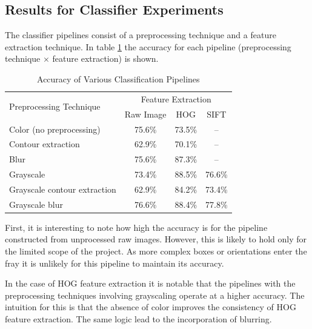 \documentclass[letterpaper, 10 pt, conference]{conf/ieeeconf}  %
\begin{document}
\subsection{Results for Classifier Experiments}
The classifier pipelines consist of a preprocessing technique and a feature
extraction technique. In table \ref{tab:classification} the accuracy for each
pipeline (preprocessing technique $\times$ feature extraction) is shown.
\begin{table}[h]
  \centering
  \begin{tabular}{l c c c}
    \toprule
    \multirow{2}{*}[-0.5\dimexpr \aboverulesep + \belowrulesep + \cmidrulewidth]{Preprocessing Technique} & \multicolumn{3}{c}{Feature Extraction}\\
    \cmidrule(lr){2-4}
                                                                                                          & Raw Image & HOG & SIFT \\
    \midrule
    Color (no preprocessing)     & 75.6\% & 73.5\%                    & -- \\
    Contour extraction           & 62.9\% & 70.1\%                    & -- \\
    Blur                         & 75.6\% & 87.3\%                    & -- \\
    Grayscale                    & 73.4\% & \cellcolor{blue!25}88.5\% & 76.6\% \\
    Grayscale contour extraction & 62.9\% & 84.2\%                    & 73.4\% \\
    Grayscale blur               & 76.6\% & 88.4\%                    & 77.8\% \\
    \bottomrule
  \end{tabular}
  \caption{Accuracy of Various Classification Pipelines}
  \label{tab:classification}
\end{table}

First, it is interesting to note how high the accuracy is for the pipeline
constructed from unprocessed raw images. However, this is likely to hold only
for the limited scope of the project. As more complex boxes or orientations
enter the fray it is unlikely for this pipeline to maintain its accuracy.

In the case of HOG feature extraction it is notable that the pipelines with the
preprocessing techniques involving grayscaling operate at a higher accuracy. The
intuition for this is that the absence of color improves the consistency of HOG
feature extraction. The same logic lead to the incorporation of blurring.
\end{document}
